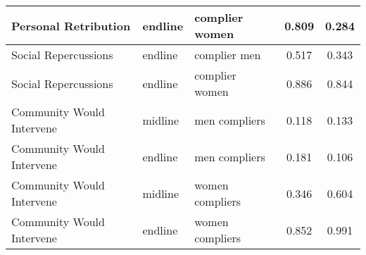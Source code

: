 \begin{tabular}{l|l|l|c|c}
\hline
Personal Retribution & endline & complier women & 0.809 & 0.284\\
\hline
Social Repercussions & endline & complier men & 0.517 & 0.343\\
\hline
Social Repercussions & endline & complier women & 0.886 & 0.844\\
\hline
Community Would Intervene & midline & men compliers & 0.118 & 0.133\\
\hline
Community Would Intervene & endline & men compliers & 0.181 & 0.106\\
\hline
Community Would Intervene & midline & women compliers & 0.346 & 0.604\\
\hline
Community Would Intervene & endline & women compliers & 0.852 & 0.991\\
\hline
\end{tabular}
